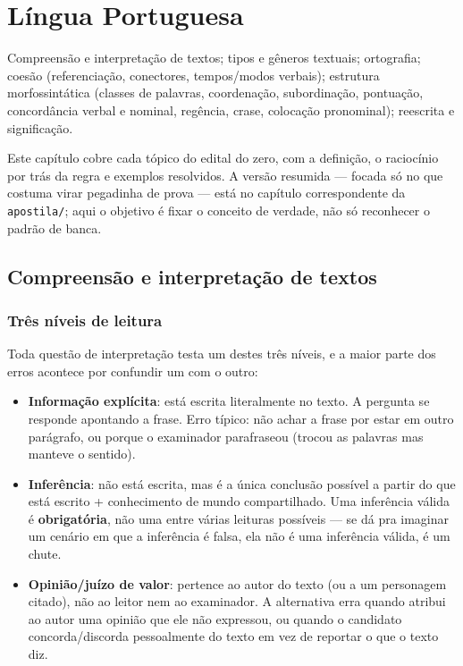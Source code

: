 \chapter{Língua Portuguesa}
\label{cap:portugues-teoria}

\begin{edital}
Compreensão e interpretação de textos; tipos e gêneros textuais; ortografia;
coesão (referenciação, conectores, tempos/modos verbais); estrutura
morfossintática (classes de palavras, coordenação, subordinação, pontuação,
concordância verbal e nominal, regência, crase, colocação pronominal);
reescrita e significação.
\end{edital}

Este capítulo cobre cada tópico do edital do zero, com a definição, o
raciocínio por trás da regra e exemplos resolvidos. A versão resumida ---
focada só no que costuma virar pegadinha de prova --- está no capítulo
correspondente da \texttt{apostila/}; aqui o objetivo é fixar o conceito de
verdade, não só reconhecer o padrão de banca.

\section{Compreensão e interpretação de textos}

\subsection{Três níveis de leitura}

Toda questão de interpretação testa um destes três níveis, e a maior parte
dos erros acontece por confundir um com o outro:

\begin{conceito}
\begin{itemize}
\item \textbf{Informação explícita}: está escrita literalmente no texto. A
pergunta se responde apontando a frase. Erro típico: não achar a frase por
estar em outro parágrafo, ou porque o examinador parafraseou (trocou as
palavras mas manteve o sentido).
\item \textbf{Inferência}: não está escrita, mas é a única conclusão possível
a partir do que está escrito + conhecimento de mundo compartilhado. Uma
inferência válida é \textbf{obrigatória}, não uma entre várias leituras
possíveis --- se dá pra imaginar um cenário em que a inferência é falsa, ela
não é uma inferência válida, é um chute.
\item \textbf{Opinião/juízo de valor}: pertence ao autor do texto (ou a um
personagem citado), não ao leitor nem ao examinador. A alternativa erra
quando atribui ao autor uma opinião que ele não expressou, ou quando o
candidato concorda/discorda pessoalmente do texto em vez de reportar o que o
texto diz.
\end{itemize}
\end{conceito}

